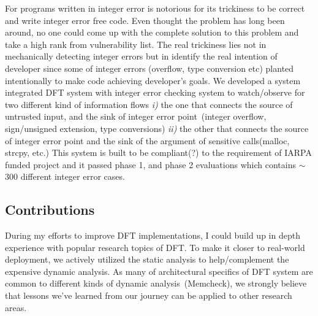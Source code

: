 \documentclass[letterpaper, 10pt]{article}
\begin{document}
\begin{small}
For programs written in integer error is notorious for its trickiness to be
correct and write integer error free code. Even thought the problem has long
been around, no one could come up with the complete solution to this problem
and take a high rank from vulnerability list.
%
The real trickiness lies not in mechanically detecting integer errors but in
identify the real intention of developer since some of integer errors
(overflow, type conversion etc) planted intentionally to make code achieving
developer's goals.
%
We developed a system integrated DFT system with integer error checking system
to watch/observe for two different kind of information flows {\it i)} the one
that connects the source of untrusted input, and the sink of integer error
point~(integer overflow, sign/unsigned extension, type conversions) {\it ii)}
the other that connects the source of integer error point and the sink of the
argument of sensitive calls(malloc, strcpy, etc.)
%
This system is built to be compliant(?) to the requirement of IARPA funded
project and it passed phase 1, and phase 2 evaluations which contains $\sim$
300 different integer error cases.


\subsection*{Contributions}
During my efforts to improve DFT implementations, I could build up in depth
experience with popular research topics of DFT.
%
To make it closer to real-world deployment, we actively utilized the static
analysis to help/complement the expensive dynamic analysis.
%
As many of architectural specifics of DFT system are common to different kinds
of dynamic analysis~(\ie Memcheck), we strongly believe that lessons we've
learned from our journey can be applied to other research areas.



\end{small}
\newpage



\end{document}
